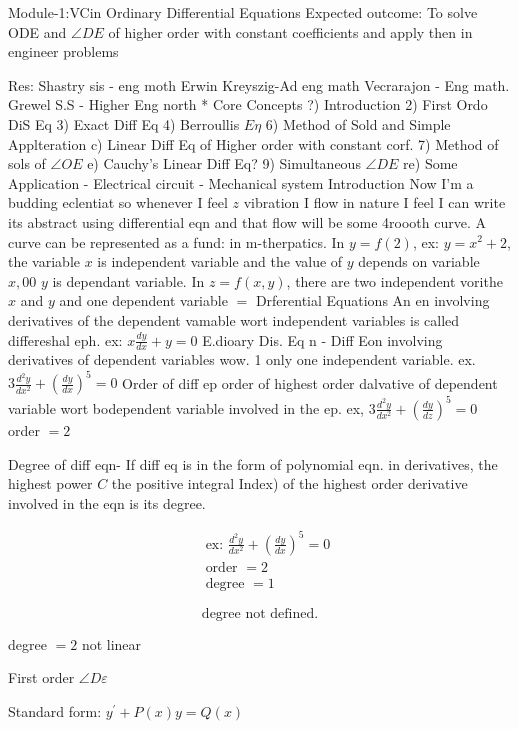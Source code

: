\documentclass[10pt]{article}
\begin{document}
Module-1:VCin
Ordinary Differential Equations
Expected outcome:
To solve ODE and $\angle D E$ of higher order with constant coefficients and apply then in engineer problems

Res:
Shastry sis - eng moth
Erwin Kreyszig-Ad eng math
Vecrarajon - Eng math.
Grewel S.S - Higher Eng north
* Core Concepts
?) Introduction
2) First Ordo DiS Eq
3) Exact Diff Eq
4) Berroullis $E \eta$
6) Method of Sold and Simple Applteration
c) Linear Diff Eq of Higher order with constant corf.
7) Method of sols of $\angle O E$
e) Cauchy's Linear Diff Eq?
9) Simultaneous $\angle D E$
re) Some Application
- Electrical circuit
- Mechanical system
Introduction
Now I'm a budding eclentiat so whenever I feel $z$ vibration I flow in nature I feel I can write its abstract using differential eqn and that flow will be some 4roooth curve. A curve can be represented as a fund: in m-therpatics.
In $y=f(2)$, ex: $y=x^2+2$, the variable $x$ is independent variable and the value of $y$ depends on variable $x, 00$ $y$ is dependant variable.
In $z=f(x, y)$, there are two independent vorithe $x$ and $y$ and one dependent variable $=$
Drferential Equations
An en involving derivatives of the dependent vamable wort independent variables is called differeshal eph. ex: $x \frac{d y}{d x}+y=0$
E.dioary Dis. Eq n
- Diff Eon involving derivatives of dependent variables wow. 1 only one independent variable.
ex. $3 \frac{d^2 y}{d x^2}+\left(\frac{d y}{d x}\right)^5=0$
Order of diff ep order of highest order dalvative of dependent variable wort bodependent variable involved in the ep.
ex, $3 \frac{d^2 y}{d x^2}+\left(\frac{d y}{d z}\right)^5=0$
order $=2$

Degree of diff eqn- If diff eq is in the form of polynomial eqn. in derivatives, the highest power $C$ the positive integral Index) of the highest order derivative involved in the eqn is its degree.

$$
\begin{aligned}
& \text { ex: } \frac{d^{2} y}{d x^{2}}+\left(\frac{d y}{d x}\right)^{5}=0 \\
& \text { order }=2 \\
& \text { degree }=1
\end{aligned}
$$

$$
\text { degree not defined. }
$$

degree $=2$ not linear

First order $\angle D \varepsilon$

Standard form: $y^{\prime}+P(x) y=Q(x)$
\end{document}
